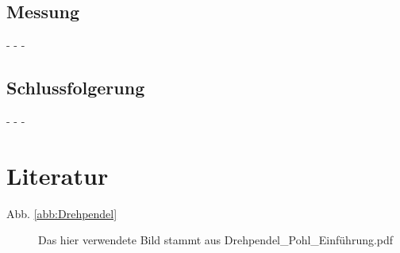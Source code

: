 \documentclass[11pt,a4paper,titlepage, ngerman]{article}
\newcommand{\refabb}[1]{Abb. \ref{abb:#1}}
\begin{document}
		\subsection*{Messung}
			
			- - -
			
		\subsection*{Schlussfolgerung}
			
			- - -

	\newpage			
	\section*{Literatur}
		\begin{description}
			\item[\refabb{Drehpendel}] Das hier verwendete Bild stammt aus \glqq Drehpendel\_Pohl\_Einführung.pdf\grqq
		\end{description}
\end{document}
